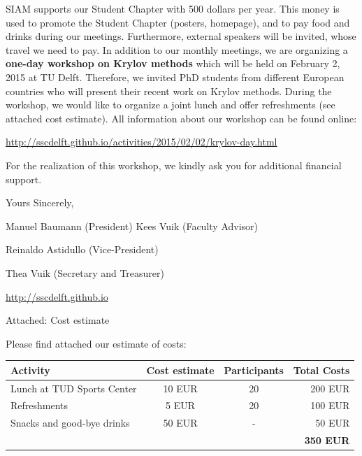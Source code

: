 \documentclass[a4paper,10pt]{article}
\begin{document}
\bigskip
SIAM supports our Student Chapter with 500 dollars per year. This money is used to promote the Student Chapter (posters, homepage), and to pay food and drinks during our meetings. Furthermore, external speakers will be invited, whose travel we need to pay. In addition to our monthly meetings, we are organizing a \textbf{one-day workshop on Krylov methods} which will be held on February 2, 2015 at TU Delft. Therefore, we invited PhD students from different European countries who will present their recent work on Krylov methods. During the workshop, we would like to organize a joint lunch and offer refreshments (see attached cost estimate). All information about our workshop can be found online:
\begin{center}
 \url{http://sscdelft.github.io/activities/2015/02/02/krylov-day.html}
\end{center}



\bigskip
\noindent For the realization of this workshop, we kindly ask you for additional financial support.

\bigskip
\noindent Yours Sincerely,

\bigskip 
\bigskip

\noindent Manuel Baumann (President) \hfill Kees Vuik (Faculty Advisor)

\noindent Reinaldo Astidullo (Vice-President)

\noindent Thea Vuik (Secretary and Treasurer)

\noindent \url{http://sscdelft.github.io}

\bigskip
\noindent Attached: Cost estimate

\newpage
Please find attached our estimate of costs:
\begin{table}[h]
\centering
\begin{tabular}{lccr}
 Activity & Cost estimate & Participants & Total Costs  \\
 \hline
 Lunch at TUD Sports Center & 10 EUR  & 20  & 200 EUR   \\
 Refreshments & 5 EUR & 20 & 100 EUR \\
 Snacks and good-bye drinks & 50 EUR & -  & 50 EUR   \\
 & & & \textbf{350 EUR}
\end{tabular}
\end{table}
\end{document}
